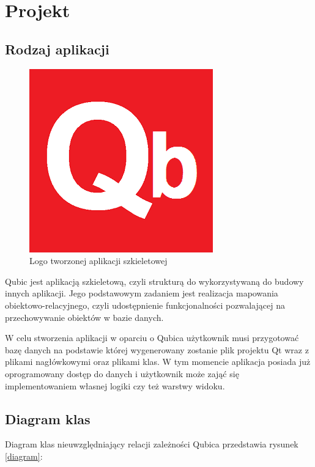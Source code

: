 \documentclass[12pt]{report}
\begin{document}
\section{Projekt}

\subsection{Rodzaj aplikacji}

\begin{figure}[h]
\centering
\includegraphics[width=.55\textwidth]{resources/qb.png}
\caption{Logo tworzonej aplikacji szkieletowej}
\end{figure}

Qubic jest aplikacją szkieletową, czyli strukturą do wykorzystywaną do budowy innych aplikacji. Jego podstawowym zadaniem jest realizacja mapowania obiektowo-relacyjnego,
czyli udostępnienie funkcjonalności pozwalającej na przechowywanie obiektów w bazie danych.

W celu stworzenia aplikacji w oparciu o Qubica użytkownik musi przygotować bazę danych na podstawie której wygenerowany zostanie plik projektu Qt wraz z plikami nagłówkowymi
oraz plikami klas. W tym momencie aplikacja posiada już oprogramowany dostęp do danych i użytkownik może zająć się implementowaniem własnej logiki czy też warstwy widoku.

\subsection{Diagram klas}

Diagram klas nieuwzględniający relacji zależności Qubica przedstawia rysunek \ref{diagram}:
\end{document}

